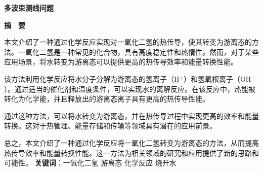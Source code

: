 \thispagestyle{empty}   %

\begin{center}
    \textbf{\fontsize{20}{1.5}多波束测线问题}

    \textbf{摘　要}
\end{center}





%
%

本文介绍了一种通过化学反应实现对一氧化二氢的热传导，使其转变为游离态的方法。一氧化二氢是一种常见的化合物，具有高度稳定性和热惰性。然而，对于某些应用场景，将水转变为游离态可以提供更高的热传导效率和能量转换性能。

该方法利用化学反应将水分子分解为游离态的氢离子（H$^+$）和氢氧根离子（OH$^-$）。通过适当的催化剂和温度条件，可以实现水的离解反应。在该反应中，热能被转化为化学能，并且释放出的游离态离子具有更高的热传导性能。

通过这种方法，可以将水转变为游离态，并在热传导过程中实现更高的效率和能量转换。这对于热管理、能量存储和传输等领域具有潜在的应用前景。

总之，本文介绍了一种通过化学反应将一氧化二氢转变为游离态的方法，从而提高热传导效率和能量转换性能。这一方法为相关领域的研究和应用提供了新的思路和可能性。\newline
\newline
\textbf{关键词}：一氧化二氢 \quad 游离态 \quad 化学反应 \quad 烧开水
